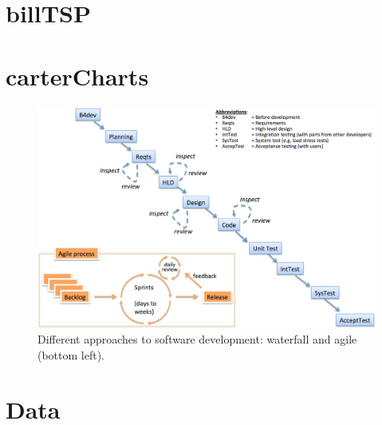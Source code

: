 \documentclass{sig-alternate}
\begin{document}



\section{billTSP}

\section{carterCharts}




 
\begin{figure}[!t]
\begin{center}
\includegraphics[width=6in]{waterfall3.png}
\end{center}
\caption{Different approaches to software development:  waterfall and agile (bottom left).}
\end{figure}

\section{Data}



\end{document}
